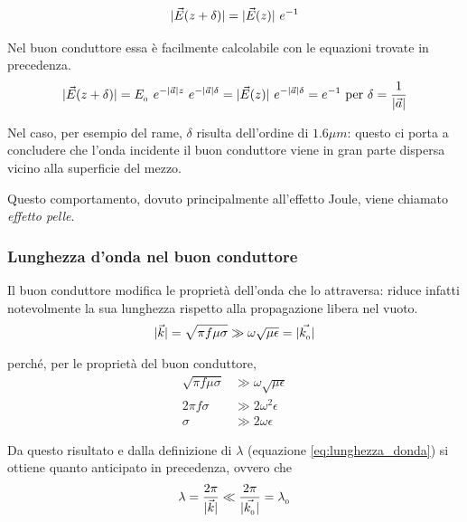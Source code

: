 		\begin{equation*}
			|\vec{E}(z + \delta)| = |\vec{E}(z)| ~ e^{-1}
		\end{equation*}

		Nel buon conduttore essa è facilmente calcolabile con le equazioni trovate in precedenza.
		\begin{equation} \begin{split} \label{eq:spessore_penetrazione}
			|\vec{E}(z + \delta)| = E_{_{0}} ~ e^{-|\vec{a}| z} ~ e^{-|\vec{a}| \delta} = |\vec{E}(z)| ~ e^{-|\vec{a}| \delta} = e^{-1} \text{ per } \delta = \frac{1}{|\vec{a}|}
		\end{split} \end{equation}

		Nel caso, per esempio del rame, $\delta$ risulta dell'ordine di $1.6 \mu m$: questo ci porta a concludere che l'onda incidente il buon conduttore viene in gran parte dispersa vicino alla superficie del mezzo.

		Questo comportamento, dovuto principalmente all'effetto Joule, viene chiamato \emph{effetto pelle}.
		\subsubsection{Lunghezza d'onda nel buon conduttore}
		Il buon conduttore modifica le proprietà dell'onda che lo attraversa: riduce infatti notevolmente la sua lunghezza rispetto alla propagazione libera nel vuoto.
		\begin{equation*} \begin{split}
			& |\vec{k}|
				= \sqrt{\pi f \mu \sigma}
				\gg \omega \sqrt{\mu \epsilon}
				= |\vec{k_{_{0}}}| \\
		\end{split} \end{equation*}

		perché, per le proprietà del buon conduttore,
		\begin{equation*} \begin{split}
				\sqrt{\pi f \mu \sigma} &\gg \omega \sqrt{\mu \epsilon} \\
				2 \pi f \sigma &\gg 2 \omega^2 \epsilon \\
				\sigma &\gg 2 \omega \epsilon
		\end{split} \end{equation*}

		Da questo risultato e dalla definizione di $\lambda$ (equazione \ref{eq:lunghezza_donda}) si ottiene quanto anticipato in precedenza, ovvero che
		\begin{equation*} \begin{split}
			& \lambda = \frac{2\pi}{|\vec{k}|} \ll \frac{2\pi}{|\vec{k_{_{0}}}|} = \lambda_{_{0}} \\
		\end{split} \end{equation*}


